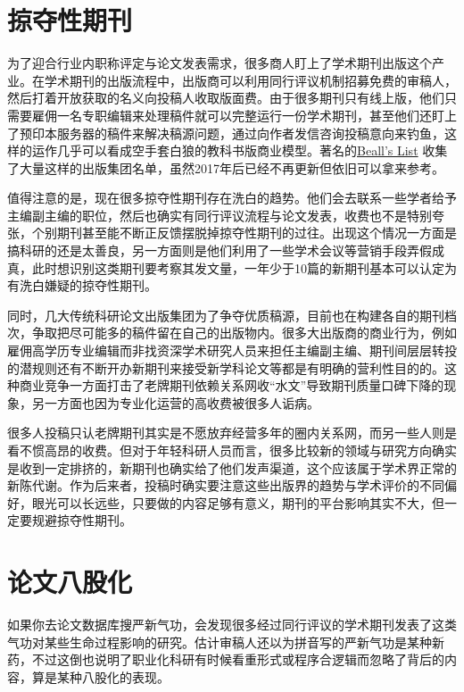 \documentclass[]{tufte-book}
\begin{document}
\hypertarget{ux63a0ux593aux6027ux671fux520a}{%
\section{掠夺性期刊}\label{ux63a0ux593aux6027ux671fux520a}}

为了迎合行业内职称评定与论文发表需求，很多商人盯上了学术期刊出版这个产业。在学术期刊的出版流程中，出版商可以利用同行评议机制招募免费的审稿人，然后打着开放获取的名义向投稿人收取版面费。由于很多期刊只有线上版，他们只需要雇佣一名专职编辑来处理稿件就可以完整运行一份学术期刊，甚至他们还盯上了预印本服务器的稿件来解决稿源问题，通过向作者发信咨询投稿意向来钓鱼，这样的运作几乎可以看成空手套白狼的教科书版商业模型。著名的\href{https://beallslist.net/}{Beall's List} 收集了大量这样的出版集团名单，虽然2017年后已经不再更新但依旧可以拿来参考。

值得注意的是，现在很多掠夺性期刊存在洗白的趋势。他们会去联系一些学者给予主编副主编的职位，然后也确实有同行评议流程与论文发表，收费也不是特别夸张，个别期刊甚至能不断正反馈摆脱掉掠夺性期刊的过往。出现这个情况一方面是搞科研的还是太善良，另一方面则是他们利用了一些学术会议等营销手段弄假成真，此时想识别这类期刊要考察其发文量，一年少于10篇的新期刊基本可以认定为有洗白嫌疑的掠夺性期刊。

同时，几大传统科研论文出版集团为了争夺优质稿源，目前也在构建各自的期刊档次，争取把尽可能多的稿件留在自己的出版物内。很多大出版商的商业行为，例如雇佣高学历专业编辑而非找资深学术研究人员来担任主编副主编、期刊间层层转投的潜规则还有不断开办新期刊来接受新学科论文等都是有明确的营利性目的的。这种商业竞争一方面打击了老牌期刊依赖关系网收``水文''导致期刊质量口碑下降的现象，另一方面也因为专业化运营的高收费被很多人诟病。

很多人投稿只认老牌期刊其实是不愿放弃经营多年的圈内关系网，而另一些人则是看不惯高昂的收费。但对于年轻科研人员而言，很多比较新的领域与研究方向确实是收到一定排挤的，新期刊也确实给了他们发声渠道，这个应该属于学术界正常的新陈代谢。作为后来者，投稿时确实要注意这些出版界的趋势与学术评价的不同偏好，眼光可以长远些，只要做的内容足够有意义，期刊的平台影响其实不大，但一定要规避掠夺性期刊。

\hypertarget{ux8bbaux6587ux516bux80a1ux5316}{%
\section{论文八股化}\label{ux8bbaux6587ux516bux80a1ux5316}}

如果你去论文数据库搜严新气功，会发现很多经过同行评议的学术期刊发表了这类气功对某些生命过程影响的研究。估计审稿人还以为拼音写的严新气功是某种新药，不过这倒也说明了职业化科研有时候看重形式或程序合逻辑而忽略了背后的内容，算是某种八股化的表现。
\end{document}
